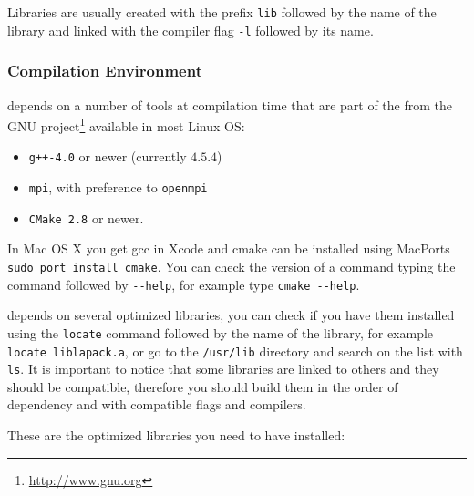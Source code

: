 Libraries are usually created with the prefix \verb!lib! followed by the name of the library
and linked with the compiler flag \verb!-l! followed by its name.

\subsubsection{Compilation Environment}
\label{sec:comp-envir}

\lifev depends on a number of tools at compilation time that are part
of the  from the GNU project\footnote{\url{http://www.gnu.org}}
available in most Linux OS:

\begin{itemize}
\item \verb!g++-4.0! or newer (currently $4.5.4$)%
\item \verb!mpi!, with preference to \verb!openmpi!
\item \verb!CMake 2.8! or newer.
\end{itemize}

In Mac OS X you get gcc in Xcode and cmake can be
installed using MacPorts \verb!sudo port install cmake!. You can check the version of a command typing the command followed by \verb!--help!,
for example type \verb!cmake --help!.

\lifev depends on several optimized libraries, you can check if you have them installed
using the \verb!locate! command followed by the name of the library, for example
\verb!locate liblapack.a!, or go to the \verb!/usr/lib! directory and search on the
list with \verb!ls!.
It is important to notice that some libraries are linked to others and they should
be compatible, therefore you should build them in the order of dependency and with
compatible flags and compilers.

These are the optimized libraries you need to have installed:

